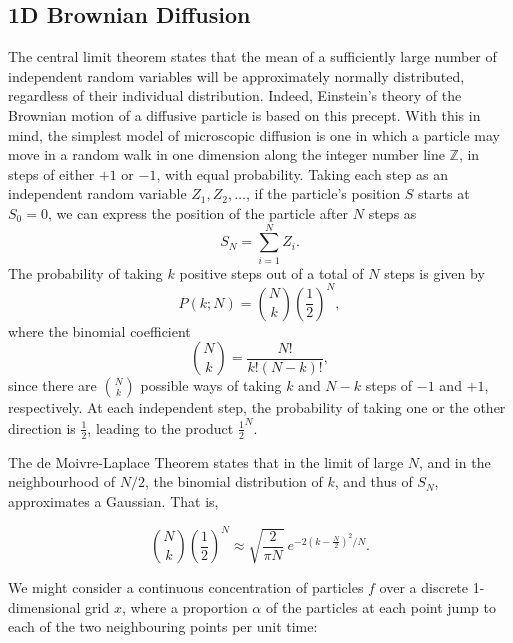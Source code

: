 	\subsection{1D Brownian Diffusion} %
	\label{sub:a_1d_random_walk_analogy}
	  The central limit theorem states that the mean of a sufficiently large number of independent random variables will be approximately normally distributed, regardless of their individual distribution. Indeed, Einstein's theory of the Brownian motion of a diffusive particle is based on this precept. With this in mind, the simplest model of microscopic diffusion is one in which a particle may move in a random walk in one dimension along the integer number line $\mathbb{Z}$, in steps of either $+1$ or $-1$, with equal probability. Taking each step as an independent random variable $Z_1, Z_2,\ldots$, if the particle's position $S$ starts at $S_0 = 0$, we can express the position of the particle after $N$ steps as
	  \begin{equation}
	    S_N = \sum\limits_{i=1}^N Z_i .
	  \end{equation}
	  The probability of taking $k$ positive steps out of a total of $N$ steps is given by
	  \begin{equation}
	    P(k;N) = \binom{N}{k}\left(\frac{1}{2} \right)^N,
	  \end{equation}
	  where the binomial coefficient
	  \begin{equation}
	    \label{eq:registration:binomial-coefficient}
	     \binom{N}{k} = \frac{N!}{k!(N-k)!},
	  \end{equation}
	  since there are $\binom{N}{k}$ possible ways of taking $k$ and $N - k$ steps of $-1$ and $+1$, respectively. At each independent step, the probability of taking one or the other direction is $\frac{1}{2}$, leading to the product $\frac{1}{2}^N$.
  
	  The de Moivre-Laplace Theorem states that in the limit of large $N$, and in the neighbourhood of $N/2$, the binomial distribution of $k$, and thus of $S_N$, approximates a Gaussian. That is,
    
	  \begin{equation}
	    \label{eq:registration:gaussian-approximation}
	    \binom{N}{k}\left(\frac{1}{2}\right)^N \approx \sqrt{\frac{2}{\pi N}} \
	      e^{-2(k - \frac{N}{2})^2/N}.
	  \end{equation}
    
	  We might consider a continuous concentration of particles $f$ over a discrete 1-dimensional grid $x$, where a proportion $\alpha$ of the particles at each point jump to each of the two neighbouring points per unit time:
    
